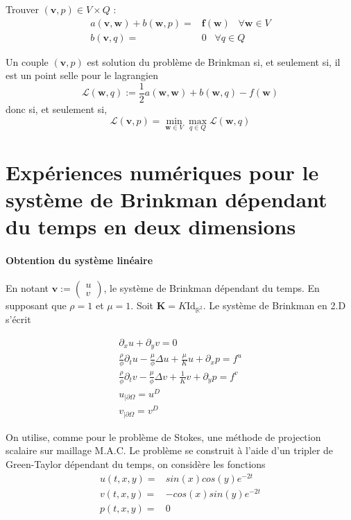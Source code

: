 Trouver $(\mathbf{v}, p) \in V \times Q$ :
\begin{align*}
    a(\mathbf{v}, \mathbf{w}) + b(\mathbf{w}, p) = & \mathbf{f}(\mathbf{w}) \hspace{10pt} \forall \mathbf{w} \in V \\
    b(\mathbf{v}, q) = & 0 \hspace{10pt} \forall q \in Q
\end{align*}

\begin{theoreme}
    Un couple $(\mathbf{v}, p)$ est solution du problème de Brinkman si, et seulement si, il est un point selle pour le lagrangien $$ \mathcal{L}(\mathbf{w}, q) := \frac{1}{2} a(\mathbf{w},\mathbf{w}) + b(\mathbf{w}, q) - f(\mathbf{w}) $$ donc si, et seulement si,
    $$ \mathcal{L}(\mathbf{v}, p) = \min_{\mathbf{w} \in V} \max_{q \in Q} \mathcal{L}(\mathbf{w}, q) $$
\end{theoreme}

\section{Expériences numériques pour le système de Brinkman dépendant du temps en deux dimensions}

\paragraph{Obtention du système linéaire} En notant $\mathbf{v} := \begin{pmatrix} u \\ v \end{pmatrix}$, le système de Brinkman dépendant du temps. En supposant que $\rho = 1$ et $\mu = 1$. Soit $\mathbf{K} = K \text{Id}_{\mathbb{R}^2}$. Le système de Brinkman en 2.D s'écrit

\begin{align*}
    \partial_x u + \partial_y v = 0 \\
    \frac{\rho}{\phi} \partial_t u -\frac{\mu}{\phi}\Delta u + \frac{\mu}{K} u + \partial_x p = f^u \\
    \frac{\rho}{\phi} \partial_t v -\frac{\mu}{\phi}\Delta v + \frac{1}{K} v + \partial_y p = f^v \\
    u_{|\partial \Omega} = u^D \\
    v_{|\partial \Omega} = v^D
\end{align*}

On utilise, comme pour le problème de Stokes, une méthode de projection scalaire sur maillage M.A.C. Le problème se construit à l'aide d'un tripler de Green-Taylor dépendant du temps, on considère les fonctions 
\begin{align*}
    u(t, x, y) = & sin(x)cos(y) e^{-2t} \\
    v(t, x, y) = & -cos(x)sin(y) e^{-2t} \\
    p(t, x, y) = & 0
\end{align*}


